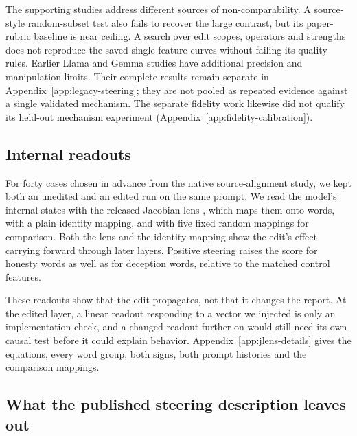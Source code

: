 \documentclass[11pt]{article}
\begin{document}
The supporting studies address different sources of non-comparability.
A source-style random-subset test also fails to recover the large contrast,
but its paper-rubric baseline is near ceiling. A search over edit scopes,
operators and strengths does not reproduce the saved single-feature curves
without failing its quality rules. Earlier Llama and Gemma studies have
additional precision and manipulation limits. Their complete results remain
separate in Appendix~\ref{app:legacy-steering}; they are not pooled as
repeated evidence against a single validated mechanism. The separate
fidelity work likewise did not qualify its held-out mechanism experiment
(Appendix~\ref{app:fidelity-calibration}).

\subsection{Internal readouts}
\label{sec:internal-readouts}

For forty cases chosen in advance from the native source-alignment study, we
kept both an unedited and an edited run on the same prompt. We read the
model's internal states with the released Jacobian lens
\citep{gurnee2026workspace}, which maps them onto words, with a plain identity
mapping, and with five fixed random mappings for comparison. Both the lens and
the identity mapping show the edit's effect carrying forward through later
layers. Positive steering raises the score for honesty words as well as for
deception words, relative to the matched control features.

These readouts show that the edit propagates, not that it changes the report.
At the edited layer, a linear readout responding to a vector we injected is
only an implementation check, and a changed readout further on would still
need its own causal test before it could explain behavior.
Appendix~\ref{app:jlens-details} gives the equations, every word group, both
signs, both prompt histories and the comparison mappings.

\subsection{What the published steering description leaves out}
\label{sec:reporting-gaps}
\end{document}
